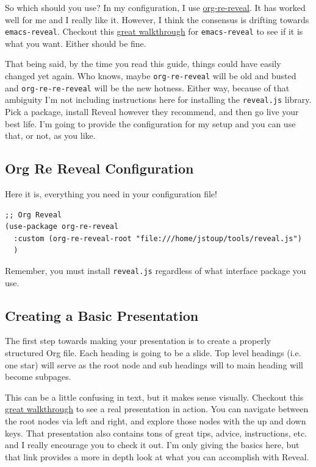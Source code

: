 \documentclass[11pt]{article}
\begin{document}
So which should you use? In my configuration, I use \href{https://github.com/emacsmirror/org-re-reveal}{org-re-reveal}. It has worked well for me and I really like it. However, I think the consensus is drifting towards \texttt{emacs-reveal}. Checkout this \href{https://oer.gitlab.io/emacs-reveal-howto/howto.html\#/sec-title-slide}{great walkthrough} for \texttt{emacs-reveal} to see if it is what you want. Either should be fine.

That being said, by the time you read this guide, things could have easily changed yet again. Who knows, maybe \texttt{org-re-reveal} will be old and busted and \texttt{org-re-re-reveal} will be the new hotness. Either way, because of that ambiguity I'm not including instructions here for installing the \texttt{reveal.js} library. Pick a package, install Reveal however they recommend, and then go live your best life. I'm going to provide the configuration for my setup and you can use that, or not, as you like.
\subsection*{Org Re Reveal Configuration}
\label{sec:orga8df3e2}
Here it is, everything you need in your configuration file!

\begin{verbatim}
;; Org Reveal
(use-package org-re-reveal
  :custom (org-re-reveal-root "file:///home/jstoup/tools/reveal.js")
  )
\end{verbatim}

Remember, you must install \texttt{reveal.js} regardless of what interface package you use.
\subsection*{Creating a Basic Presentation}
\label{sec:org7018fa6}
The first step towards making your presentation is to create a properly structured Org file. Each heading is going to be a slide. Top level headings (i.e. one star) will serve as the root node and sub headings will to main heading will become subpages.

This can be a little confusing in text, but it makes sense visually. Checkout this \href{https://oer.gitlab.io/emacs-reveal-howto/howto.html\#/sec-title-slide}{great walkthrough} to see a real presentation in action. You can navigate between the root nodes via left and right, and explore those nodes with the up and down keys. That presentation also contains tons of great tips, advice, instructions, etc. and I really encourage you to check it out. I'm only giving the basics here, but that link provides a more in depth look at what you can accomplish with Reveal.
\end{document}
